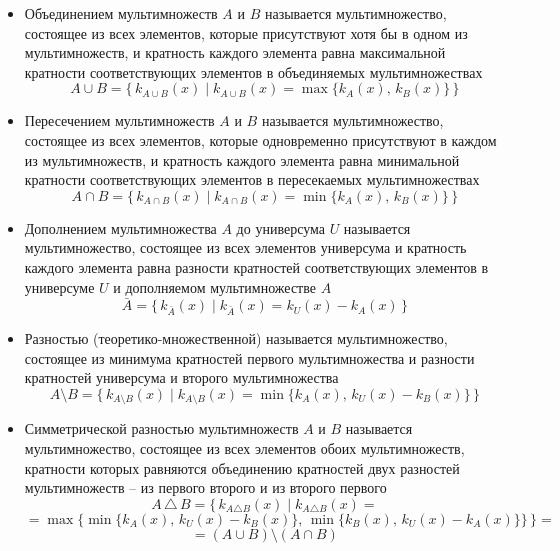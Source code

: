 \documentclass[14pt,a4paper]{extreport}
\begin{document}
\begin{itemize}
    \item Объединением мультимножеств \(A\) и \(B\) называется мультимножество, состоящее из всех элементов, которые присутствуют хотя бы в одном из мультимножеств, и кратность каждого элемента равна максимальной кратности соответствующих элементов в объединяемых мультимножествах
    $$ A \cup B = \{\, k_{A \cup B}(x) \mid k_{A \cup B}(x) = \max\{k_A(x),\, k_B(x)\} \,\} $$
    \item Пересечением мультимножеств \(A\) и \(B\) называется мультимножество, состоящее из всех элементов, которые одновременно присутствуют в каждом из мультимножеств, и кратность каждого элемента равна минимальной кратности соответствующих элементов в пересекаемых мультимножествах
    $$ A \cap B = \{\, k_{A \cap B}(x) \mid k_{A \cap B}(x) = \min\{k_A(x),\, k_B(x)\} \,\}$$
    \item Дополнением мультимножества \(A\) до универсума \(U\) называется мультимножество, состоящее из всех элементов универсума и кратность каждого элемента равна разности кратностей соответствующих элементов в универсуме \(U\) и дополняемом мультимножестве \(A\)
    $$\bar{A} = \{\, k_{\bar{A}}(x) \mid k_{\bar{A}}(x) = k_U(x) - k_A(x) \,\}$$
    \item Разностью (теоретико-множественной) называется мультимножество, состоящее из минимума кратностей первого мультимножества и разности кратностей универсума и второго мультимножества
    $$A \setminus B = \{\, k_{A \setminus B}(x) \mid k_{A \setminus B}(x) = \min\{k_A(x),\, k_U(x) - k_B(x)\} \,\}$$
    \item Симметрической разностью мультимножеств \(A\) и \(B\) называется мультимножество, состоящее из всех элементов обоих мультимножеств, кратности которых равняются объединению кратностей двух разностей мультимножеств -- из первого второго и из второго первого
    $$A \,\triangle\, B = \{\, k_{A \triangle B}(x) \mid k_{A \triangle B}(x) = $$
    $$= \max\{\min\{k_A(x),\, k_U(x) - k_B(x)\},\, \min\{k_B(x),\, k_U(x) - k_A(x)\}\} \,\} =$$
    $$= (A \cup B) \setminus (A \cap B)$$
\end{itemize}
\end{document}
